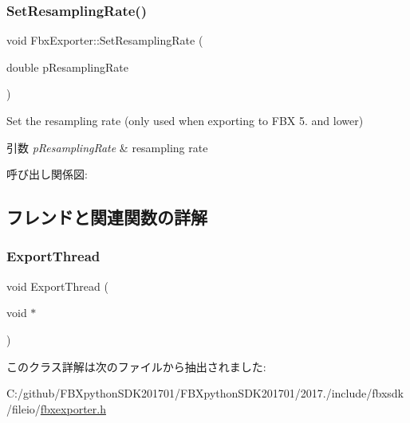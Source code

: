 \subsubsection{\texorpdfstring{Set\+Resampling\+Rate()}{SetResamplingRate()}}
{\footnotesize\ttfamily void Fbx\+Exporter\+::\+Set\+Resampling\+Rate (\begin{DoxyParamCaption}\item[{double}]{p\+Resampling\+Rate }\end{DoxyParamCaption})}

Set the resampling rate (only used when exporting to F\+BX 5. and lower) 
\begin{DoxyParams}{引数}
{\em p\+Resampling\+Rate} & resampling rate \\
\hline
\end{DoxyParams}
呼び出し関係図\+:


\subsection{フレンドと関連関数の詳解}
\mbox{\label{class_fbx_exporter_af010f0ee37fe98ae37cd7cbe976e7a74}} 
\subsubsection{\texorpdfstring{Export\+Thread}{ExportThread}}
{\footnotesize\ttfamily void Export\+Thread (\begin{DoxyParamCaption}\item[{void $\ast$}]{ }\end{DoxyParamCaption})\hspace{0.3cm}{\ttfamily [friend]}}



このクラス詳解は次のファイルから抽出されました\+:\begin{DoxyCompactItemize}
\item 
C\+:/github/\+F\+B\+Xpython\+S\+D\+K201701/\+F\+B\+Xpython\+S\+D\+K201701/2017./include/fbxsdk/fileio/\hyperlink{fbxexporter_8h}{fbxexporter.\+h}\end{DoxyCompactItemize}
